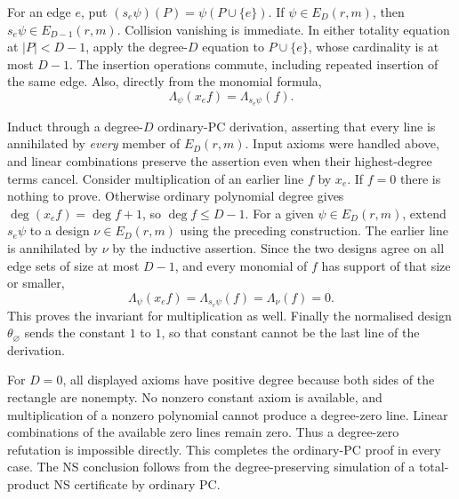 For an edge $e$, put $(s_e\psi)(P)=\psi(P\cup\{e\})$.
If $\psi\in E_D(r,m)$, then $s_e\psi\in E_{D-1}(r,m)$.
Collision vanishing is immediate.  In either totality equation at
$|P|<D-1$, apply the degree-$D$ equation to $P\cup\{e\}$, whose
cardinality is at most $D-1$.  The insertion operations commute,
including repeated insertion of the same edge.  Also, directly from
the monomial formula,
\[
 \Lambda_\psi(x_ef)=\Lambda_{s_e\psi}(f).
\]

Induct through a degree-$D$ ordinary-PC derivation, asserting that every
line is annihilated by \emph{every} member of $E_D(r,m)$.  Input axioms
were handled above, and linear combinations preserve the assertion
even when their highest-degree terms cancel.  Consider multiplication
of an earlier line $f$ by $x_e$.  If $f=0$ there is nothing to prove.
Otherwise ordinary polynomial degree gives
$\deg(x_ef)=\deg f+1$, so $\deg f\leq D-1$.
For a given $\psi\in E_D(r,m)$, extend $s_e\psi$ to a design
$\nu\in E_D(r,m)$ using the preceding construction.  The earlier line
is annihilated by $\nu$ by the inductive assertion.  Since the two
designs agree on all edge sets of size at most $D-1$, and every monomial
of $f$ has support of that size or smaller,
\[
 \Lambda_\psi(x_ef)=\Lambda_{s_e\psi}(f)=\Lambda_\nu(f)=0.
\]
This proves the invariant for multiplication as well.  Finally the
normalised design $\theta_{\varnothing}$ sends the constant $1$ to $1$,
so that constant cannot be the last line of the derivation.

For $D=0$, all displayed axioms have positive degree because both sides
of the rectangle are nonempty.  No nonzero constant axiom is available,
and multiplication of a nonzero polynomial cannot produce a degree-zero
line.  Linear combinations of the available zero lines remain zero.
Thus a degree-zero refutation is impossible directly.  This completes
the ordinary-PC proof in every case.  The NS conclusion follows from
the degree-preserving simulation of a total-product NS certificate by
ordinary PC.
